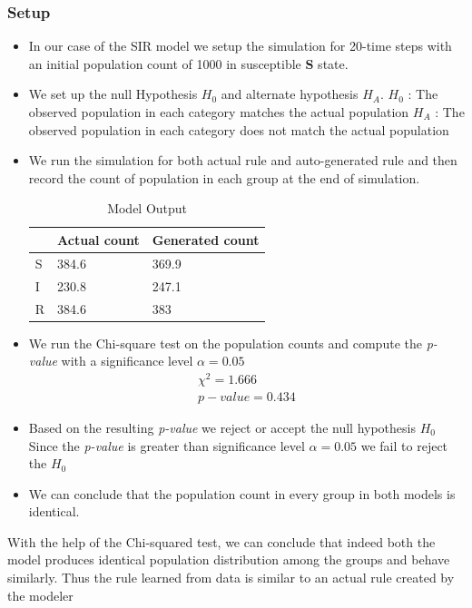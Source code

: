 \documentclass[11pt, a4paper]{article} %
\begin{document}
\subsubsection{Setup} 

\begin{itemize}
	\item In our case of the SIR model we setup the simulation for 20-time steps with an initial population count of 1000 in susceptible \textbf{S} state.
	\item We set up the null Hypothesis $H_0$  and alternate hypothesis $H_A$.
		\subitem $H_0$ : The observed population in each category matches the actual population
		\subitem $H_A$ : The observed population in each category does not match the actual population
	\item We run the simulation for both actual rule and auto-generated rule and then record the count of population in each group at the end of simulation.
	\begin{table}[h!]
		\centering
		\label{table:counts}
		\caption{Model Output}
		\begin{tabular}{|l|l|l|}
			\hline
			& Actual count & Generated count \\ \hline
			S & 384.6        & 369.9           \\ \hline
			I & 230.8        & 247.1           \\ \hline
			R & 384.6        & 383             \\ \hline
		\end{tabular}
	\end{table}
	\item We run the Chi-square test on the population counts and compute the \textit{p-value} with a significance level $\alpha = 0.05$
	\begin{equation}
	\begin{gathered}
	\chi^2 = 1.666\\
	p-value = 0.434
	\end{gathered}
	\end{equation}
	\item Based on the resulting \textit{p-value} we reject or accept the null hypothesis $H_0$
	\subitem Since the \textit{p-value} is greater than significance level $\alpha =0.05$ we fail to reject the $H_0$ 
	\item We can conclude that the population count in every group in both models is identical.
\end{itemize}
With the help of the Chi-squared test, we can conclude that indeed both the model produces identical population distribution among the groups and behave similarly. Thus the rule learned from data is similar to an actual rule created by the modeler
\end{document}
